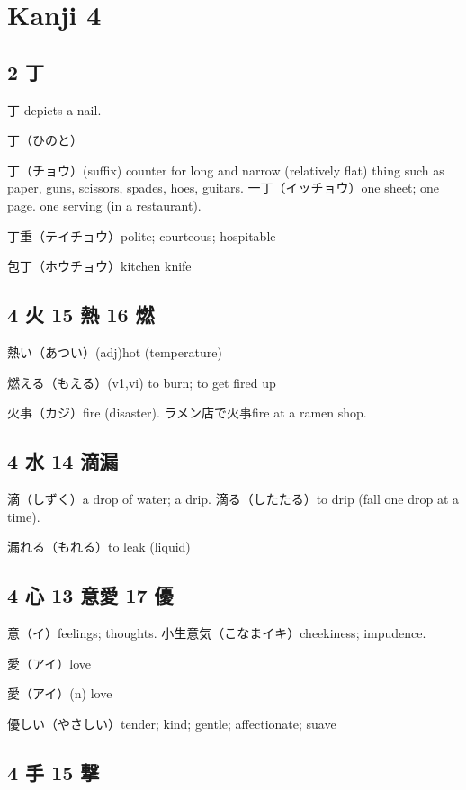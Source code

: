 \chapter{Kanji 4}

\section{2 丁}

丁 depicts a nail.

丁（ひのと）

丁（チョウ）(suffix)
counter for long and narrow (relatively flat) thing
such as paper, guns, scissors, spades, hoes, guitars.
一丁（イッチョウ）one sheet; one page.
one serving (in a restaurant).

丁重（テイチョウ）polite; courteous; hospitable

包丁（ホウチョウ）kitchen knife

\section{4 火 15 熱 16 燃}

熱い（あつい）(adj)hot (temperature)

燃える（もえる）(v1,vi) to burn; to get fired up

火事（カジ）fire (disaster).
ラメン店で火事fire at a ramen shop.

\section{4 水 14 滴漏}

滴（しずく）a drop of water; a drip.
滴る（したたる）to drip (fall one drop at a time).

漏れる（もれる）to leak (liquid)

\section{4 心 13 意愛 17 優}

意（イ）feelings; thoughts.
小生意気（こなまイキ）cheekiness; impudence.

愛（アイ）love

愛（アイ）(n) love

優しい（やさしい）tender; kind; gentle; affectionate; suave

\section{4 手 15 撃}

